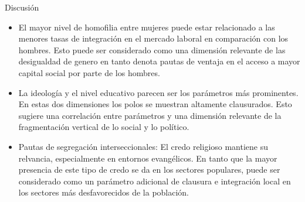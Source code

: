 \documentclass[
  8pt,
  ignorenonframetext,
]{beamer}
\begin{document}
\begin{frame}{Discusión}
\protect\hypertarget{discusiuxf3n}{}
\begin{itemize}
\item
  El mayor nivel de homofilia entre mujeres puede estar relacionado a
  las menores tasas de integración en el mercado laboral en comparación
  con los hombres. Esto puede ser considerado como una dimensión
  relevante de las desigualdad de genero en tanto denota pautas de
  ventaja en el acceso a mayor capital social por parte de los hombres.
\item
  La ideología y el nivel educativo parecen ser los parámetros más
  prominentes. En estas dos dimensiones los polos se muestran altamente
  clausurados. Esto sugiere una correlación entre parámetros y una
  dimensión relevante de la fragmentación vertical de lo social y lo
  político.
\item
  Pautas de segregación interseccionales: El credo religioso mantiene su
  relvancia, especialmente en entornos evangélicos. En tanto que la
  mayor presencia de este tipo de credo se da en los sectores populares,
  puede ser considerado como un parámetro adicional de clausura e
  integración local en los sectores más desfavorecidos de la población.
\end{itemize}
\end{frame}
\end{document}
